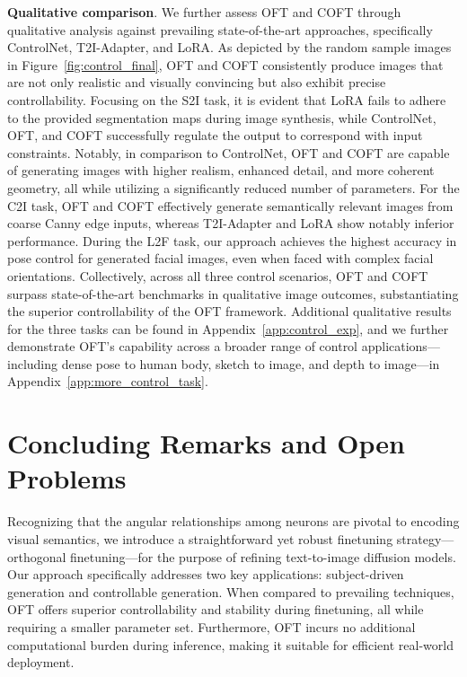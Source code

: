 \textbf{Qualitative comparison}. We further assess OFT and COFT through qualitative analysis against prevailing state-of-the-art approaches, specifically ControlNet, T2I-Adapter, and LoRA. As depicted by the random sample images in Figure~\ref{fig:control_final}, OFT and COFT consistently produce images that are not only realistic and visually convincing but also exhibit precise controllability. Focusing on the S2I task, it is evident that LoRA fails to adhere to the provided segmentation maps during image synthesis, while ControlNet, OFT, and COFT successfully regulate the output to correspond with input constraints. Notably, in comparison to ControlNet, OFT and COFT are capable of generating images with higher realism, enhanced detail, and more coherent geometry, all while utilizing a significantly reduced number of parameters. For the C2I task, OFT and COFT effectively generate semantically relevant images from coarse Canny edge inputs, whereas T2I-Adapter and LoRA show notably inferior performance. During the L2F task, our approach achieves the highest accuracy in pose control for generated facial images, even when faced with complex facial orientations. Collectively, across all three control scenarios, OFT and COFT surpass state-of-the-art benchmarks in qualitative image outcomes, substantiating the superior controllability of the OFT framework. Additional qualitative results for the three tasks can be found in Appendix~\ref{app:control_exp}, and we further demonstrate OFT’s capability across a broader range of control applications—including dense pose to human body, sketch to image, and depth to image—in Appendix~\ref{app:more_control_task}.

\section{Concluding Remarks and Open Problems}

Recognizing that the angular relationships among neurons are pivotal to encoding visual semantics, we introduce a straightforward yet robust finetuning strategy—orthogonal finetuning—for the purpose of refining text-to-image diffusion models. Our approach specifically addresses two key applications: subject-driven generation and controllable generation. When compared to prevailing techniques, OFT offers superior controllability and stability during finetuning, all while requiring a smaller parameter set. Furthermore, OFT incurs no additional computational burden during inference, making it suitable for efficient real-world deployment.

